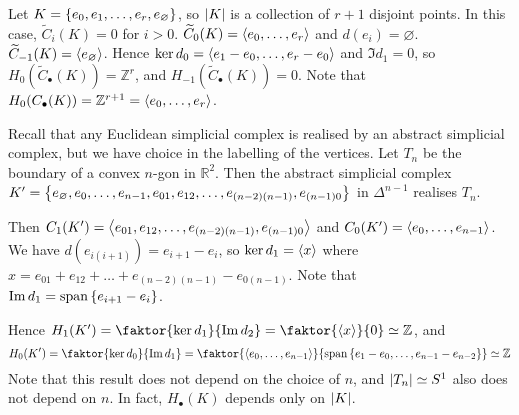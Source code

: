 \begin{example}
	Let \( K = \qty{e_0, e_1, \dots, e_r, e_\varnothing} \), so \( \abs{K} \) is a collection of \( r + 1 \) disjoint points.
	In this case, \( \widetilde C_i(K) = 0 \) for \( i > 0 \).
	\( \widetilde C_0(K) = \left\langle{} e_0, \dots, e_r \right\rangle \) and \( d(e_i) = \varnothing \).
	\( \widetilde C_{-1}(K) = \left\langle{} e_\varnothing \right\rangle \).
	Hence \( \ker d_0 = \left\langle{} e_1-e_0, \dots, e_r-e_0 \right\rangle \) and \( \Im d_1 = 0 \), so \( H_0(\widetilde C_\bullet(K)) = \mathbb Z^r \), and \( H_{-1}(\widetilde C_\bullet(K)) = 0 \).
	Note that \( H_0(C_\bullet(K)) = \mathbb Z^{r+1} = \left\langle{} e_0, \dots, e_r \right\rangle \).
\end{example}
\begin{example}
	Recall that any Euclidean simplicial complex is realised by an abstract simplicial complex, but we have choice in the labelling of the vertices.
	Let \( T_n \) be the boundary of a convex \( n \)-gon in \( \mathbb R^2 \).
	Then the abstract simplicial complex \( K' = \qty{e_\varnothing, e_0, \dots, e_{n-1}, e_{01}, e_{12}, \dots, e_{(n-2)(n-1)}, e_{(n-1)0}} \) in \( \Delta^{n-1} \) realises \( T_n \).

	Then \( C_1(K') = \left\langle{} e_{01}, e_{12}, \dots, e_{(n-2)(n-1)}, e_{(n-1)0} \right\rangle \) and \( C_0(K') = \left\langle{} e_0, \dots, e_{n-1} \right\rangle \).
	We have \( d(e_{i(i+1)}) = e_{i+1} - e_i \), so \( \ker d_1 = \left\langle{} x \right\rangle \) where \( x = e_{01} + e_{12} + \dots + e_{(n-2)(n-1)} - e_{0(n-1)} \).
	Note that \( \operatorname{Im} d_1 = \operatorname{span}\qty{e_{i+1} - e_i} \).

	Hence \( H_1(K') = \faktor{\ker d_1}{\Im d_2} = \faktor{\genset{x}}{0} \simeq \mathbb Z \), and
	\[ H_0(K') = \faktor{\ker d_0}{\Im d_1} = \faktor{\genset{e_0, \dots, e_{n-1}}}{\vecspan\qty{e_1 - e_0, \dots, e_{n-1} - e_{n-2}}} \simeq \mathbb Z \]
	Note that this result does not depend on the choice of \( n \), and \( \abs{T_n} \simeq S^1 \) also does not depend on \( n \).
	In fact, \( H_\bullet(K) \) depends only on \( \abs{K} \).
\end{example}

